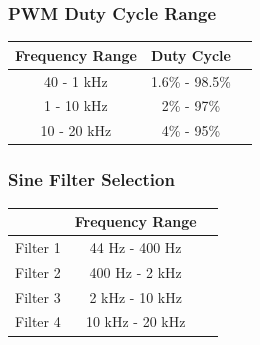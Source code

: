 \documentclass[11pt]{article}
\begin{document}
\vspace{5mm}
\begin{multicols}{2}
\subsubsection*{PWM Duty Cycle Range}

\begin{tabular}{| c | c | c |}
\hline
Frequency Range & Duty Cycle \\
\hline
40 - 1 kHz & 1.6\% - 98.5\% \\
\hline
1 - 10 kHz & 2\% - 97\% \\
\hline
10 - 20 kHz & 4\% - 95\% \\
\hline
\end{tabular}

\subsubsection*{Sine Filter Selection}

\begin{tabular}{| c | c | c |}
\hline
 & Frequency Range\\
\hline
Filter 1 & 44 Hz - 400 Hz \\
\hline
Filter 2 & 400 Hz - 2 kHz \\
\hline
Filter 3 & 2 kHz - 10 kHz \\
\hline
Filter 4 & 10 kHz - 20 kHz \\
\hline
\end{tabular}
\end{multicols}
\end{document}
